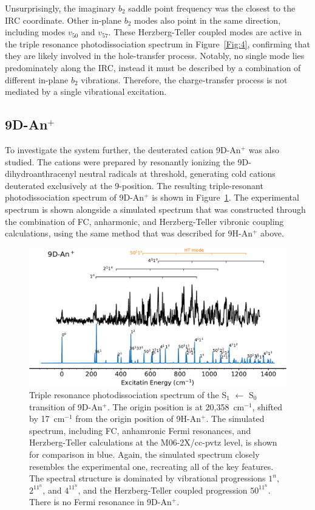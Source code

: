 \documentclass[journal=jpcafh,manuscript=article,layout=onecolumn, 12pt]{achemso}
\begin{document}
Unsurprisingly, the imaginary $b_2$ saddle point frequency was the closest to the IRC coordinate. Other in-plane $b_2$ modes also point in the same direction, including modes $v_{50}$ and $v_{57}$. These Herzberg-Teller coupled modes are active in the triple resonance photodissociation spectrum in Figure~\ref{Fig:4}, confirming that they are likely involved in the hole-transfer process. %
Notably, no single mode lies predominately along the IRC, instead it must be described by a combination of different in-plane $b_2$ vibrations. Therefore, the charge-transfer process is not mediated by a single vibrational excitation.

\subsection{9D-An$^+$}
To investigate the system further, the deuterated cation 9D-An$^+$ was also studied. The cations were prepared by resonantly ionizing the 9D-dihydroanthracenyl neutral radicals at threshold, generating cold cations deuterated exclusively at the 9-position. The resulting triple-resonant photodissociation spectrum of 9D-An$^+$ is shown in Figure~\ref{Fig:6}. The experimental spectrum is shown alongside a simulated spectrum that was constructed through the combination of FC, anharmonic, and Herzberg-Teller vibronic coupling calculations, using the same method that was described for 9H-An$^+$ above.

\begin{figure} [h]
	\includegraphics[width=1\textwidth]{figures/9D-An+sw}
	\caption{Triple resonance photodissociation spectrum of the S$_1$ $\leftarrow$ S$_0$  transition of 9D-An$^+$. The origin position is at 20,358~cm$^{-1}$, shifted by 17~cm$^{-1}$ from the origin position of 9H-An$^+$. The simulated spectrum, including FC, anhamronic Fermi resonances, and Herzberg-Teller calculations at the M06-2X/cc-pvtz level, is shown for comparison in blue. Again, the simulated spectrum closely resembles the experimental one, recreating all of the key features. The spectral structure is dominated by vibrational progressions $1^n$, $2^11^n$, and $4^11^n$, and the Herzberg-Teller coupled progression $50^11^n$. There is no Fermi resonance in 9D-An$^+$. }
	\label{Fig:6}
\end{figure}
\end{document}
